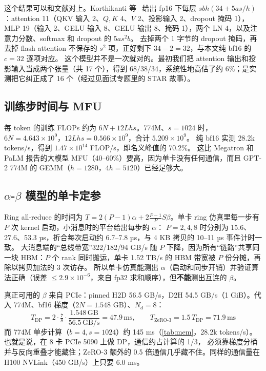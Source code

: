 \documentclass[11pt,a4paper]{ctexart}
\begin{document}
这个结果可以和文献对上。Korthikanti 等~\cite{korthikanti2022} 给出 fp16 下每层 $sbh(34+5as/h)$：attention 11（QKV 输入 2、$Q,K$ 4、$V$ 2、投影输入 2、dropout 掩码 1），
MLP 19（输入 2、GELU 输入 8、GELU 输出 8、掩码 1），两个 LN 4，以及注意力分数、softmax 和 dropout 的 $5as^2b$。
去掉两个 1 字节的 dropout 掩码，再去掉 flash attention 不保存的 $s^2$ 项，正好剩下 $34-2=32$，与本文纯 bf16 的 $c=32$ 逐项对应。
这个模型并不是一次就对的。最初我们把 attention 输出和投影输入当成两个张量（共 17 个），得到 68/38/34，系统性地高估了约 6\%；是实测把它纠正成了 16 个（经过见面试专题里的 STAR 故事）。

\subsection{训练步时间与 MFU}
每 token 的训练 FLOPs 约为 $6N + 12Lhs$。774M、$s=1024$ 时，$6N=4.643\times10^9$，$12Lhs=0.566\times10^9$，合计 $5.209\times10^9$。
纯 bf16 实测 28.2k tokens/s，得到 $1.47\times10^{14}$ FLOP/s，即名义峰值的 70.2\%。
这比 Megatron 和 PaLM 报告的大模型 MFU（40--60\%）要高，因为单卡没有任何通信，而且 GPT-2 774M 的 GEMM（$h=1280$，$4h=5120$）已经足够大。

\subsection{$\alpha$-$\beta$ 模型的单卡定参}
Ring all-reduce 的时间为 $T = 2(P-1)\alpha + 2\frac{P-1}{P}S\beta$。单卡 ring 仿真里每一步有 $P$ 次 kernel 启动，小消息时的平台给出每步的 $\alpha$：
$P=2,4,8$ 时分别为 15.6、27.6、53.3 µs，折合每次启动约 6.7--7.8 µs，与 4 KB 拷贝的 10--11 µs 事件计时一致。
大消息端的“总线带宽”322/182/94 GB/s 随 $P$ 下降，因为所有“链路”共享同一块 HBM：$P$ 个 rank 同时搬运，单卡 1.52 TB/s 的 HBM 带宽被 $P$ 份分摊，再除以拷贝加法的 3 次访存。
所以单卡仿真能测出 $\alpha$（启动和同步开销）并验证算法正确（误差 $\le2.9\times10^{-6}$，来自 fp32 求和顺序），但\textbf{不能}测出互连的 $\beta$。

真正可用的 $\beta$ 来自 PCIe：pinned H2D 56.5 GB/s，D2H 54.5 GB/s（1 GiB）。代入 774M、bf16 梯度（$2N=1.548$ GB）、$N_d=8$：
\begin{equation}
T_{\text{DP}} = 2\cdot\tfrac{7}{8}\cdot\frac{1.548\,\text{GB}}{56.5\,\text{GB/s}} = 47.9\,\text{ms},\qquad
T_{\text{ZeRO-3}} = 1.5\,T_{\text{DP}} = 71.9\,\text{ms}
\end{equation}
而 774M 单步计算（$b=4,s=1024$）约 145 ms（\cref{tab:mem}，28.2k tokens/s）。也就是说，在 8 卡 PCIe 5090 上做 DP，通信约占计算的 1/3，
必须靠梯度分桶并与反向重叠才能藏住；ZeRO-3 额外的 0.5 倍通信几乎藏不住。同样的通信量在 H100 NVLink（450 GB/s）上只要 6.0 ms。
\end{document}
